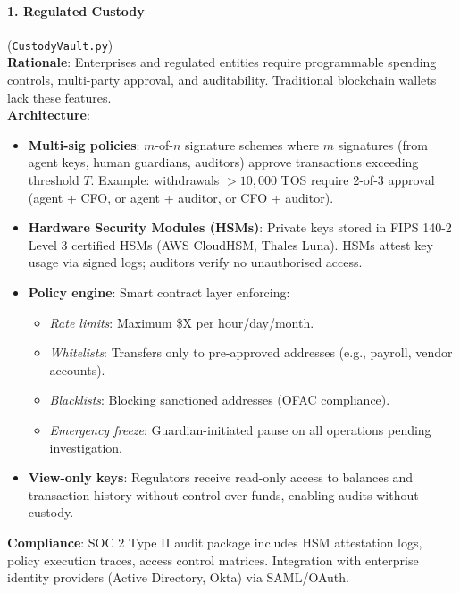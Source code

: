 \documentclass[11pt]{article}
\begin{document}
\paragraph{1. Regulated Custody} (\texttt{CustodyVault.py})\\
\textbf{Rationale}: Enterprises and regulated entities require programmable spending controls, multi-party approval, and auditability. Traditional blockchain wallets lack these features.\\
\textbf{Architecture}:
\begin{itemize}[noitemsep]
  \item \textbf{Multi-sig policies}: $m$-of-$n$ signature schemes where $m$ signatures (from agent keys, human guardians, auditors) approve transactions exceeding threshold $T$. Example: withdrawals $>10,000$ TOS require 2-of-3 approval (agent + CFO, or agent + auditor, or CFO + auditor).
  \item \textbf{Hardware Security Modules (HSMs)}: Private keys stored in FIPS 140-2 Level 3 certified HSMs (AWS CloudHSM, Thales Luna). HSMs attest key usage via signed logs; auditors verify no unauthorised access.
  \item \textbf{Policy engine}: Smart contract layer enforcing:
    \begin{itemize}[noitemsep]
      \item \emph{Rate limits}: Maximum \$X per hour/day/month.
      \item \emph{Whitelists}: Transfers only to pre-approved addresses (e.g., payroll, vendor accounts).
      \item \emph{Blacklists}: Blocking sanctioned addresses (OFAC compliance).
      \item \emph{Emergency freeze}: Guardian-initiated pause on all operations pending investigation.
    \end{itemize}
  \item \textbf{View-only keys}: Regulators receive read-only access to balances and transaction history without control over funds, enabling audits without custody.
\end{itemize}
\textbf{Compliance}: SOC 2 Type II audit package includes HSM attestation logs, policy execution traces, access control matrices. Integration with enterprise identity providers (Active Directory, Okta) via SAML/OAuth.
\end{document}
